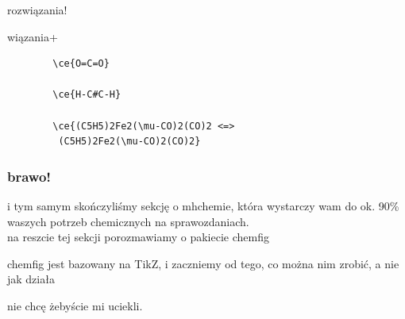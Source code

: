 \documentclass{beamer}
\theoremstyle{newblock}
\begin{document}
\begin{frame}[fragile=singleslide]{rozwiązania!}
\begin{exampleblock}{wiązania+}
    \begin{verbatim}
        \ce{O=C=O}
        
        \ce{H-C#C-H}
        
        \ce{(C5H5)2Fe2(\mu-CO)2(CO)2 <=>
         (C5H5)2Fe2(\mu-CO)2(CO)2}
    \end{verbatim} 
\end{exampleblock}
\end{frame}
\begin{frame}
    \frametitle{brawo!}
    i tym samym skończyliśmy sekcję o mhchemie, która wystarczy wam do ok. 90\% waszych potrzeb chemicznych na sprawozdaniach. \\\vspace{5mm}
    \pause na reszcie tej sekcji porozmawiamy o pakiecie chemfig    
\end{frame}
\begin{frame}[standout]
    chemfig jest bazowany na TikZ, i zaczniemy od tego, co można nim zrobić, a nie jak działa
\end{frame}
\begin{frame}
    \centering nie chcę żebyście mi uciekli.
\end{frame}
\end{document}
